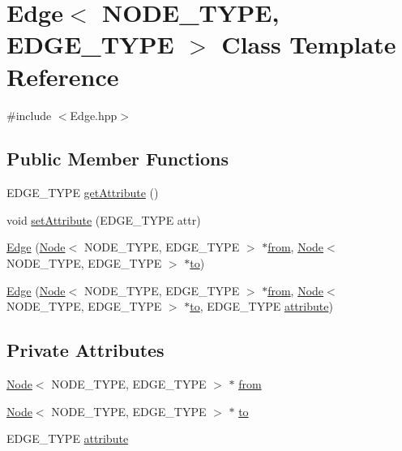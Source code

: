 \hypertarget{class_edge}{\section{Edge$<$ N\+O\+D\+E\+\_\+\+T\+Y\+P\+E, E\+D\+G\+E\+\_\+\+T\+Y\+P\+E $>$ Class Template Reference}
\label{class_edge}
}


{\ttfamily \#include $<$Edge.\+hpp$>$}

\subsection*{Public Member Functions}
\begin{DoxyCompactItemize}
\item 
E\+D\+G\+E\+\_\+\+T\+Y\+P\+E \hyperlink{class_edge_a3352ae81439c772a0ebe640f14f8b910}{get\+Attribute} ()
\item 
void \hyperlink{class_edge_aa63f7fac23602924d2e19f1389a93620}{set\+Attribute} (E\+D\+G\+E\+\_\+\+T\+Y\+P\+E attr)
\item 
\hyperlink{class_edge_a16c5157732e48a737ca0a1d7841e8e19}{Edge} (\hyperlink{class_node}{Node}$<$ N\+O\+D\+E\+\_\+\+T\+Y\+P\+E, E\+D\+G\+E\+\_\+\+T\+Y\+P\+E $>$ $\ast$\hyperlink{class_edge_a1bffa41df2941b7d55c59a5031f78e14}{from}, \hyperlink{class_node}{Node}$<$ N\+O\+D\+E\+\_\+\+T\+Y\+P\+E, E\+D\+G\+E\+\_\+\+T\+Y\+P\+E $>$ $\ast$\hyperlink{class_edge_a7ba6dee1554e4a0a7cf69862e90fdd85}{to})
\item 
\hyperlink{class_edge_a6d1f57f17db61020c1e51c09ff8ab7bb}{Edge} (\hyperlink{class_node}{Node}$<$ N\+O\+D\+E\+\_\+\+T\+Y\+P\+E, E\+D\+G\+E\+\_\+\+T\+Y\+P\+E $>$ $\ast$\hyperlink{class_edge_a1bffa41df2941b7d55c59a5031f78e14}{from}, \hyperlink{class_node}{Node}$<$ N\+O\+D\+E\+\_\+\+T\+Y\+P\+E, E\+D\+G\+E\+\_\+\+T\+Y\+P\+E $>$ $\ast$\hyperlink{class_edge_a7ba6dee1554e4a0a7cf69862e90fdd85}{to}, E\+D\+G\+E\+\_\+\+T\+Y\+P\+E \hyperlink{class_edge_ae49cc056dfa848b0a1beef821d81a31d}{attribute})
\end{DoxyCompactItemize}
\subsection*{Private Attributes}
\begin{DoxyCompactItemize}
\item 
\hyperlink{class_node}{Node}$<$ N\+O\+D\+E\+\_\+\+T\+Y\+P\+E, E\+D\+G\+E\+\_\+\+T\+Y\+P\+E $>$ $\ast$ \hyperlink{class_edge_a1bffa41df2941b7d55c59a5031f78e14}{from}
\item 
\hyperlink{class_node}{Node}$<$ N\+O\+D\+E\+\_\+\+T\+Y\+P\+E, E\+D\+G\+E\+\_\+\+T\+Y\+P\+E $>$ $\ast$ \hyperlink{class_edge_a7ba6dee1554e4a0a7cf69862e90fdd85}{to}
\item 
E\+D\+G\+E\+\_\+\+T\+Y\+P\+E \hyperlink{class_edge_ae49cc056dfa848b0a1beef821d81a31d}{attribute}
\end{DoxyCompactItemize}
